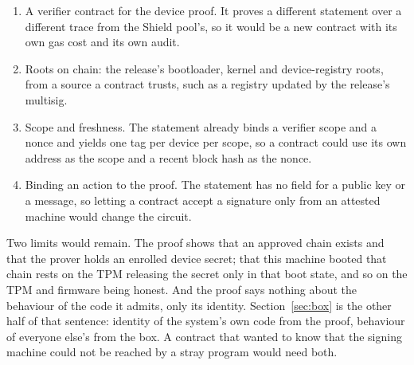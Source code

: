 \begin{enumerate}
\item A verifier contract for the device proof. It proves a different statement over a different trace from the Shield pool's, so it would be a new contract with its own gas cost and its own audit.
\item Roots on chain: the release's bootloader, kernel and device-registry roots, from a source a contract trusts, such as a registry updated by the release's multisig.
\item Scope and freshness. The statement already binds a verifier scope and a nonce and yields one tag per device per scope, so a contract could use its own address as the scope and a recent block hash as the nonce.
\item Binding an action to the proof. The statement has no field for a public key or a message, so letting a contract accept a signature only from an attested machine would change the circuit.
\end{enumerate}

Two limits would remain. The proof shows that an approved chain exists and that the prover holds an enrolled device secret; that this machine booted that chain rests on the TPM releasing the secret only in that boot state, and so on the TPM and firmware being honest. And the proof says nothing about the behaviour of the code it admits, only its identity. Section~\ref{sec:box} is the other half of that sentence: identity of the system's own code from the proof, behaviour of everyone else's from the box. A contract that wanted to know that the signing machine could not be reached by a stray program would need both.
